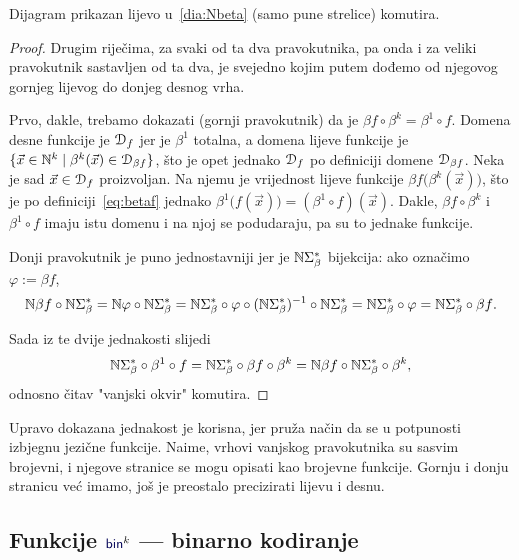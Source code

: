 \begin{lema}[{name=[brojevni-jezični-brojevni dijagram komutira]}]\label{lm:pravkomut}
Dijagram prikazan lijevo u~\eqref{dia:Nbeta} (samo pune strelice) komutira.
\end{lema}
\begin{proof}
Drugim riječima, za svaki od ta dva pravokutnika, pa onda i za veliki pravokutnik sastavljen od ta dva, je svejedno kojim putem dođemo od njegovog gornjeg lijevog do donjeg desnog vrha.

Prvo, dakle, trebamo dokazati (gornji pravokutnik) da je $\beta f\circ\beta^k =\beta^1\circ f$. Domena desne funkcije je $\mathcal D_{f}$ jer je $\beta^1$ totalna, a domena lijeve funkcije je $\{\vec x\in{\mathbb N}^k\mid\beta^k(\vec x)\in\mathcal D_{\beta f}\}$, što je opet jednako $\mathcal D_{f}$ po definiciji domene $\mathcal D_{\beta f}$. Neka je sad $\vec x\in\mathcal D_{f}$ proizvoljan. Na njemu je vrijednost lijeve funkcije $\beta f\bigl(\beta^k(\vec x)\bigr)$, što je po definiciji~\eqref{eq:betaf} jednako $\beta^1\bigl(f(\vec x)\bigr)=(\beta^1\circ f)(\vec x)$. Dakle, $\beta f\circ\beta^k$ i $\beta^1\circ f$ imaju istu domenu i na njoj se podudaraju, pa su to jednake funkcije.

Donji pravokutnik je puno jednostavniji jer je ${\mathbb N}\Sigma_\beta^*$ bijekcija: ako označimo $\varphi:=\beta f$,
\begin{equation}
    {\mathbb N}\beta f\circ{\mathbb N}\Sigma_\beta^*={\mathbb N}\varphi\circ{\mathbb N}\Sigma_\beta^*={\mathbb N}\Sigma_\beta^*\circ\varphi\circ({\mathbb N}\Sigma_\beta^*)^{-1}\circ{\mathbb N}\Sigma_\beta^*={\mathbb N}\Sigma_\beta^*\circ\varphi={\mathbb N}\Sigma_\beta^*\circ\beta f\text.
\end{equation}

Sada iz te dvije jednakosti slijedi
\begin{equation}\label{eq:pravkomut}
    {\mathbb N}\Sigma_\beta^*\circ\beta^1\circ f={\mathbb N}\Sigma_\beta^*\circ\beta f\circ\beta^k={\mathbb N}\beta f\circ{\mathbb N}\Sigma_\beta^*\circ\beta^k\text,
\end{equation}
odnosno čitav "\!vanjski okvir" komutira.
\end{proof}

Upravo dokazana jednakost je korisna, jer pruža način da se u potpunosti izbjegnu jezične funkcije. Naime, vrhovi vanjskog pravokutnika su sasvim brojevni, i njegove stranice se mogu opisati kao brojevne funkcije. Gornju i donju stranicu već imamo, još je preostalo precizirati lijevu i desnu.

\subsection{Funkcije \texorpdfstring{$\f{bin}^k$}{bin} --- binarno kodiranje}

